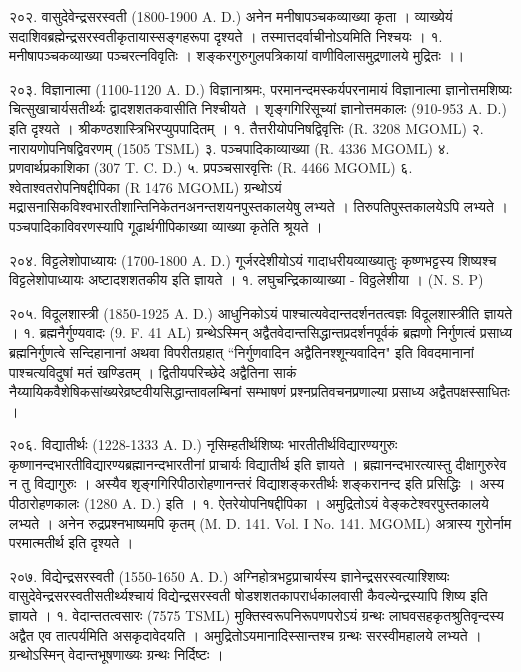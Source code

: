 २०२. वासुदेवेन्द्रसरस्वती (1800-1900 A. D.)
अनेन मनीषापञ्चकव्याख्या कृता । व्याख्येयं सदाशिवब्रह्मेन्द्रसरस्वतीकृतायास्सङ्गहरूपा दृश्यते । तस्मात्तदर्वाचीनोऽयमिति निश्चयः ।
१. मनीषापञ्चकव्याख्या पञ्चरत्नविवृतिः । शङ्करगुरुगुलपत्रिकायां वाणीविलासमुद्रणालये मुद्रितः ।।

२०३. विज्ञानात्मा (1100-1120 A. D.)
विज्ञानाश्रमः, परमानन्दमस्कर्यपरनामायं विज्ञानात्मा ज्ञानोत्तमशिष्यः चित्सुखाचार्यसतीर्थ्यः द्वादशशतकवासीति निश्चीयते । शृङ्गगिरिसूच्यां ज्ञानोत्तमकालः (910-953 A. D.) इति दृश्यते । श्रीकण्ठशास्त्रिभिरप्युपपादितम् ।
१. तैत्तरीयोपनिषद्विवृत्तिः (R. 3208 MGOML)
२. नारायणोपनिषद्विवरणम् (1505 TSML)
३. पञ्चपादिकाव्याख्या (R. 4336 MGOML)
४. प्रणवार्थप्रकाशिका (307 T. C. D.)
५. प्रपञ्चसारवृत्तिः (R. 4466 MGOML)
६. श्वेताश्वतरोपनिषद्दीपिका (R 1476 MGOML)
ग्रन्थोऽयं मद्रासनासिकविश्वभारतीशान्तिनिकेतनअनन्तशयनपुस्तकालयेषु लभ्यते । तिरुपतिपुस्तकालयेऽपि लभ्यते । पञ्चपादिकाविवरणस्यापि गूढार्थगीपिकाख्या व्याख्या कृतेति श्रूयते ।

२०४. विट्टलेशोपाध्यायः (1700-1800 A. D.)
गूर्जरदेशीयोऽयं गादाधरीयव्याख्यातुः कृष्णभट्टस्य शिष्यश्च विट्टलेशोपाध्यायः अष्टादशशतकीय इति ज्ञायते ।
१. लघुचन्द्रिकाव्याख्या - विठ्ठलेशीया । (N. S. P)

२०५. विदूलशास्त्री (1850-1925 A. D.)
आधुनिकोऽयं पाश्चात्यवेदान्तदर्शनतत्वज्ञः विदूलशास्त्रीति ज्ञायते ।
१. ब्रह्मनैर्गुण्यवादः (9. F. 41 AL)
ग्रन्थेऽस्मिन् अद्वैतवेदान्तसिद्धान्तप्रदर्शनपूर्वकं ब्रह्मणो निर्गुणत्वं प्रसाध्य ब्रह्मनिर्गुणत्वे सन्दिहानानां अथवा विपरीतग्रहात् ``निर्गुणवादिन अद्वैतिनश्शून्यवादिन" इति विवदमानानां पाश्चत्यविदुषां मतं खण्डितम् । द्वितीयपरिच्छेदे अद्वैतिना साकं नैय्यायिकवैशेषिकसांख्यरेव्रष्टवीयसिद्धान्तावलम्बिनां सम्भाषणं प्रश्नप्रतिवचनप्रणाल्या प्रसाध्य अद्वैतपक्षस्साधितः ।

२०६. विद्यातीर्थः (1228-1333 A. D.)
नृसिम्हतीर्थशिष्यः भारतीतीर्थविद्यारण्यगुरुः कृष्णानन्दभारतीविद्यारण्यब्रह्मानन्दभारतीनां प्राचार्यः विद्यातीर्थ इति ज्ञायते । ब्रह्मानन्दभारत्यास्तु दीक्षागुरुरेव न तु विद्यागुरुः । अस्यैव शृङ्गगिरिपीठारोहणानन्तरं विद्याशङ्करतीर्थः शङ्करानन्द इति प्रसिद्धिः । अस्य पीठारोहणकालः (1280 A. D.) इति ।
१. ऐतरेयोपनिषद्दीपिका । अमुद्रितोऽयं वेङ्कटेश्वरपुस्तकालये लभ्यते । अनेन रुद्रप्रश्नभाष्यमपि कृतम् (M. D. 141. Vol. I No. 141. MGOML) अत्रास्य गुरोर्नाम परमात्मतीर्थ इति दृश्यते ।

२०७. विद्येन्द्रसरस्वती (1550-1650 A. D.)
अग्निहोत्रभट्टप्राचार्यस्य ज्ञानेन्द्रसरस्वत्याश्शिष्यः वासुदेवेन्द्रसरस्वतीसतीर्थ्यश्चायं विद्येन्द्रसरस्वती षोडशशतकापरार्धकालवासी कैवल्येन्द्रस्यापि शिष्य इति ज्ञायते ।
१. वेदान्ततत्वसारः (7575 TSML)
मुक्तिस्वरूपनिरूपणपरोऽयं ग्रन्थः लाघवसहकृतश्रुतिवृन्दस्य अद्वैत एव तात्पर्यमिति असकृदावेदयति । अमुद्रितोऽयमानादिस्सान्तश्च ग्रन्थः सरस्वीमहालये लभ्यते । ग्रन्थोऽस्मिन् वेदान्तभूषणाख्यः ग्रन्थः निर्दिष्टः ।

